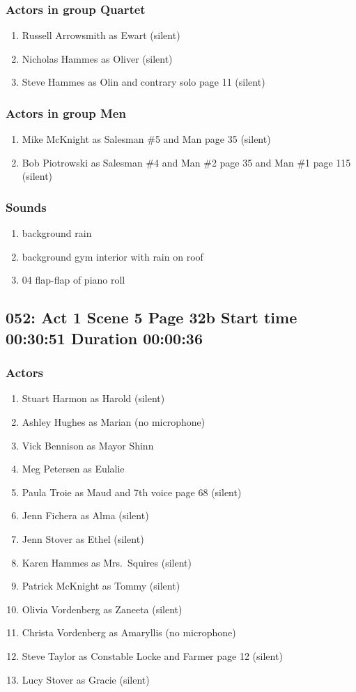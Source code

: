 \subsubsection{Actors in group Quartet}
\begin{enumerate}
\item Russell Arrowsmith as Ewart (silent)
\item Nicholas Hammes as Oliver (silent)
\item Steve Hammes as Olin and contrary solo page 11 (silent)
\end{enumerate}
\subsubsection{Actors in group Men}
\begin{enumerate}
\item Mike McKnight as Salesman \#5 and Man page 35 (silent)
\item Bob Piotrowski as Salesman \#4 and Man \#2 page 35 and Man \#1 page 115 (silent)
\end{enumerate}

\subsubsection{Sounds}
\begin{enumerate}
\item background rain
\item background gym interior with rain on roof
\item 04 flap-flap of piano roll
\end{enumerate}
\subsection{052: Act 1 Scene 5 Page 32b Start time 00:30:51 Duration 00:00:36}

\subsubsection{Actors}
\begin{enumerate}
\item Stuart Harmon as Harold (silent)
\item Ashley Hughes as Marian (no microphone)
\item Vick Bennison as Mayor Shinn
\item Meg Petersen as Eulalie
\item Paula Troie as Maud and 7th voice page 68 (silent)
\item Jenn Fichera as Alma (silent)
\item Jenn Stover as Ethel (silent)
\item Karen Hammes as Mrs.~Squires (silent)
\item Patrick McKnight as Tommy (silent)
\item Olivia Vordenberg as Zaneeta (silent)
\item Christa Vordenberg as Amaryllis (no microphone)
\item Steve Taylor as Constable Locke and Farmer page 12 (silent)
\item Lucy Stover as Gracie (silent)
\end{enumerate}
